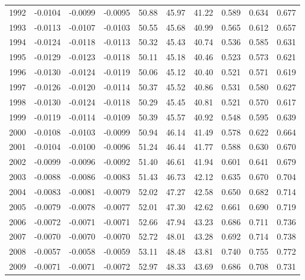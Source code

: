\begin{tabular}{cccccccccc}
  1992 & -0.0104 & -0.0099 & -0.0095 & 50.88 & 45.97 & 41.22 & 0.589 & 0.634 & 0.677 \\ 
  1993 & -0.0113 & -0.0107 & -0.0103 & 50.55 & 45.68 & 40.99 & 0.565 & 0.612 & 0.657 \\ 
  1994 & -0.0124 & -0.0118 & -0.0113 & 50.32 & 45.43 & 40.74 & 0.536 & 0.585 & 0.631 \\ 
  1995 & -0.0129 & -0.0123 & -0.0118 & 50.11 & 45.18 & 40.46 & 0.523 & 0.573 & 0.621 \\ 
  1996 & -0.0130 & -0.0124 & -0.0119 & 50.06 & 45.12 & 40.40 & 0.521 & 0.571 & 0.619 \\ 
  1997 & -0.0126 & -0.0120 & -0.0114 & 50.37 & 45.52 & 40.86 & 0.531 & 0.580 & 0.627 \\ 
  1998 & -0.0130 & -0.0124 & -0.0118 & 50.29 & 45.45 & 40.81 & 0.521 & 0.570 & 0.617 \\ 
  1999 & -0.0119 & -0.0114 & -0.0109 & 50.39 & 45.57 & 40.92 & 0.548 & 0.595 & 0.639 \\ 
  2000 & -0.0108 & -0.0103 & -0.0099 & 50.94 & 46.14 & 41.49 & 0.578 & 0.622 & 0.664 \\ 
  2001 & -0.0104 & -0.0100 & -0.0096 & 51.24 & 46.44 & 41.77 & 0.588 & 0.630 & 0.670 \\ 
  2002 & -0.0099 & -0.0096 & -0.0092 & 51.40 & 46.61 & 41.94 & 0.601 & 0.641 & 0.679 \\ 
  2003 & -0.0088 & -0.0086 & -0.0083 & 51.43 & 46.73 & 42.12 & 0.635 & 0.670 & 0.704 \\ 
  2004 & -0.0083 & -0.0081 & -0.0079 & 52.02 & 47.27 & 42.58 & 0.650 & 0.682 & 0.714 \\ 
  2005 & -0.0079 & -0.0078 & -0.0077 & 52.01 & 47.30 & 42.62 & 0.661 & 0.690 & 0.719 \\ 
  2006 & -0.0072 & -0.0071 & -0.0071 & 52.66 & 47.94 & 43.23 & 0.686 & 0.711 & 0.736 \\ 
  2007 & -0.0070 & -0.0070 & -0.0070 & 52.72 & 48.01 & 43.28 & 0.692 & 0.714 & 0.738 \\ 
  2008 & -0.0057 & -0.0058 & -0.0059 & 53.11 & 48.48 & 43.81 & 0.740 & 0.755 & 0.772 \\ 
  2009 & -0.0071 & -0.0071 & -0.0072 & 52.97 & 48.33 & 43.69 & 0.686 & 0.708 & 0.731 \\ 
   \hline
\end{tabular}
